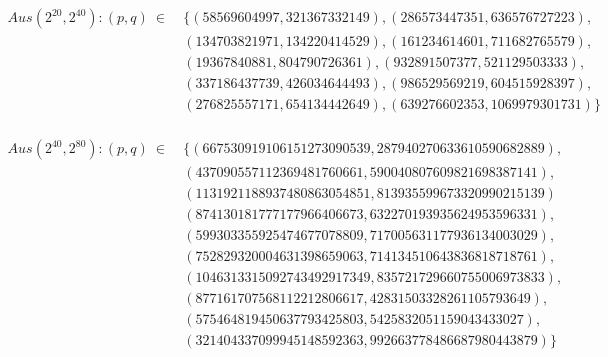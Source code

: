 \begin{refsegment}
\begin{equation*}
  \begin{split}
Aus (2^{20},2^{40}): (p,q)~\in~
            & \{ (58569604997,321367332149),(286573447351,636576727223),\\
            &    (134703821971,134220414529),(161234614601,711682765579),\\
            &    (19367840881, 804790726361),(932891507377,521129503333),\\
            &    (337186437739,426034644493),(986529569219,604515928397),\\
            &    (276825557171,654134442649),(639276602353,1069979301731) \}\\
  \end{split}
\end{equation*}

\begin{equation*}
  \begin{split}
Aus (2^{40}, 2^{80}): (p,q)~\in~
            & \{ (667530919106151273090539,287940270633610590682889),\\
            &    (437090557112369481760661,590040807609821698387141),\\
            &    (1131921188937480863054851,813935599673320990215139)\\
            &    (874130181777177966406673,632270193935624953596331),\\
            &    (599303355925474677078809,717005631177936134003029),\\
            &    (752829320004631398659063,714134510643836818718761),\\
            &    (1046313315092743492917349,835721729660755006973833),\\
            &    (877161707568112212806617,42831503328261105793649),\\
            &    (575464819450637793425803, 5425832051159043433027),\\
            &    (321404337099945148592363,992663778486687980443879) \}\\
  \end{split}
\end{equation*}


\end{refsegment}
